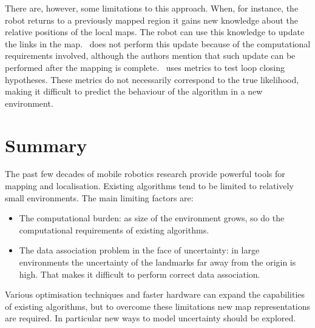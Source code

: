 There are, however, some limitations to this approach. When, for
instance, the robot returns to a previously mapped region it gains new
knowledge about the relative positions of the local maps. The robot
can use this knowledge to update the links in the map. \Atlas\ does
not perform this update because of the computational requirements
involved, although the authors mention that such update can be performed
after the mapping is complete. \Atlas\ uses metrics to test loop
closing hypotheses. These metrics do not necessarily correspond to the
true likelihood, making it difficult to predict the behaviour of the
algorithm in a new environment.

\section{Summary}


The past few decades of mobile robotics research provide powerful
tools for mapping and localisation. Existing algorithms tend to be
limited to relatively small environments. The main limiting factors
are:

\begin{itemize}
\item The computational burden: as size of the environment grows, so do
  the computational requirements of existing algorithms.

\item The data association problem in the face of uncertainty: 
   in large environments the uncertainty of the landmarks far away
  from the origin is high. That makes it difficult to perform correct
  data association.

\end{itemize}

Various optimisation techniques and faster hardware can expand the
capabilities of existing algorithms, but to overcome these limitations
new map representations are required. In particular new ways to model
uncertainty should be explored.







